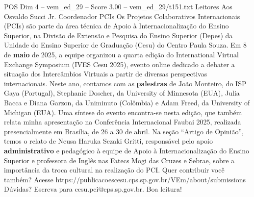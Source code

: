 \begin{textsample}{POS Dim 4 – vem\_ed\_29 – Score 3.00 – vem\_ed\_29/t151.txt}  \label{ex:f4_pos_010}
Leitores Aos Osvaldo Succi Jr.
Coordenador PCIs Os Projetos Colaborativos Internacionais (PCIs) são parte da área técnica de Apoio à Internacionalização do Ensino Superior, na Divisão de Extensão e Pesquisa do Ensino Superior (Depes) da Unidade do Ensino Superior de Graduação (Cesu) do Centro Paula Souza.
Em 8 de \textbf{maio} de 2025, a equipe organizou a quarta edição do International Virtual Exchange Symposium (IVES Cesu 2025), evento online dedicado a debater a situação dos Intercâmbios Virtuais a partir de diversas perspectivas internacionais.
Neste ano, contamos com as \textbf{palestras} de João Monteiro, do ISP Gaya (Portugal), Stephanie Doscher, da University of Minnesota (EUA), Julia Bacca e Diana Garzon, da Uniminuto (Colômbia) e Adam Freed, da University of Michigan (EUA).
Uma síntese do evento encontra-se nesta edição, que também relata minha apresentação na Conferência Internacional Faubai 2025, realizada presencialmente em Brasília, de 26 a 30 de abril.
Na seção “Artigo de Opinião”, temos o relato de Neusa Haruka Sezaki Gritti, responsável pelo apoio \textbf{administrativo} e pedagógico à equipe de Apoio à Internacionalização do Ensino Superior e professora de Inglês nas Fatecs Mogi das Cruzes e Sebrae, sobre a importância da troca cultural na realização do PCI.
Quer contribuir você também?
Acesse https://publicacoescesu.cps.sp.gov.br/VEm/about/submissions Dúvidas?
Escreva para cesu.pci@cps.sp.gov.br.
Boa leitura!

\end{textsample}
